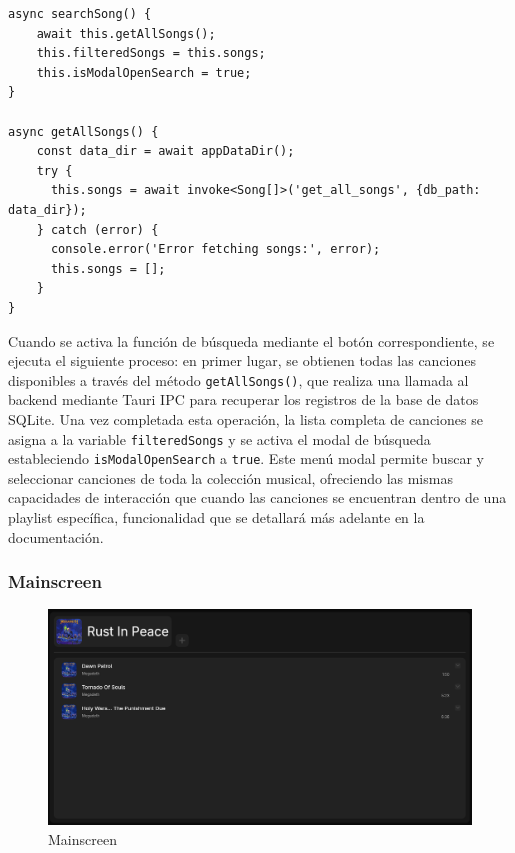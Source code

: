 \documentclass[11pt, a4paper]{article}
\begin{document}
                \begin{lstlisting}[caption={searchSong()}]
async searchSong() {
    await this.getAllSongs();
    this.filteredSongs = this.songs;
    this.isModalOpenSearch = true;
}

async getAllSongs() {
    const data_dir = await appDataDir();
    try {
      this.songs = await invoke<Song[]>('get_all_songs', {db_path: data_dir});
    } catch (error) {
      console.error('Error fetching songs:', error);
      this.songs = [];
    }
}
                \end{lstlisting}

                Cuando se activa la función de búsqueda mediante el botón correspondiente, se ejecuta el siguiente proceso: en primer lugar, se obtienen todas las canciones disponibles a través del método \verb|getAllSongs()|, que realiza una llamada al backend mediante Tauri IPC para recuperar los registros de la base de datos SQLite. Una vez completada esta operación, la lista completa de canciones se asigna a la variable \verb|filteredSongs| y se activa el modal de búsqueda estableciendo \verb|isModalOpenSearch| a \verb|true|. Este menú modal permite buscar y seleccionar canciones de toda la colección musical, ofreciendo las mismas capacidades de interacción que cuando las canciones se encuentran dentro de una playlist específica, funcionalidad que se detallará más adelante en la documentación.


            \subsubsection{Mainscreen}

            \begin{figure}[H]
                \centering
                \includegraphics[width=1\textwidth]{media/screenshots/playlist.png}
                \caption{Mainscreen}
                \label{fig:Mainscreen}
            \end{figure}
\end{document}
